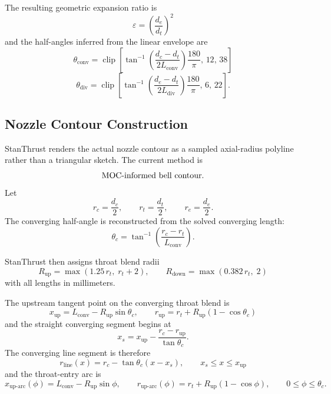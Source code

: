 \documentclass[11pt]{article}
\newcommand{\clip}{\operatorname{clip}}
\begin{document}
The resulting geometric expansion ratio is
\begin{equation}
\varepsilon = \left(\frac{d_e}{d_t}\right)^2
\label{eq:expansion-ratio}
\end{equation}
and the half-angles inferred from the linear envelope are
\begin{equation}
\theta_{\text{conv}}
=
\clip\!\left[
\tan^{-1}\!\left(
\frac{d_c-d_t}{2L_{\text{conv}}}
\right)\frac{180}{\pi},
\,
12,\,
38
\right]
\label{eq:conv-angle}
\end{equation}
\begin{equation}
\theta_{\text{div}}
=
\clip\!\left[
\tan^{-1}\!\left(
\frac{d_e-d_t}{2L_{\text{div}}}
\right)\frac{180}{\pi},
\,
6,\,
22
\right].
\label{eq:div-angle}
\end{equation}

\subsection{Nozzle Contour Construction}
StanThrust renders the actual nozzle contour as a sampled axial-radius polyline rather than a triangular sketch. The current method is
\[
\text{MOC-informed bell contour}.
\]
Let
\[
r_c=\frac{d_c}{2},\qquad r_t=\frac{d_t}{2},\qquad r_e=\frac{d_e}{2}.
\]
The converging half-angle is reconstructed from the solved converging length:
\begin{equation}
\theta_c=\tan^{-1}\!\left(\frac{r_c-r_t}{L_{\text{conv}}}\right).
\label{eq:converging-half-angle}
\end{equation}

StanThrust then assigns throat blend radii
\begin{equation}
R_{\text{up}}=\max(1.25\,r_t,\;r_t+2),
\qquad
R_{\text{down}}=\max(0.382\,r_t,\;2)
\label{eq:throat-blend-radii}
\end{equation}
with all lengths in millimeters.

The upstream tangent point on the converging throat blend is
\begin{equation}
x_{\text{up}}=L_{\text{conv}}-R_{\text{up}}\sin\theta_c,
\qquad
r_{\text{up}}=r_t+R_{\text{up}}\left(1-\cos\theta_c\right)
\label{eq:upstream-tangent}
\end{equation}
and the straight converging segment begins at
\begin{equation}
x_s=x_{\text{up}}-\frac{r_c-r_{\text{up}}}{\tan\theta_c}.
\label{eq:straight-converging-start}
\end{equation}
The converging line segment is therefore
\begin{equation}
r_{\text{line}}(x)=r_c-\tan\theta_c\left(x-x_s\right),
\qquad x_s\le x\le x_{\text{up}}
\label{eq:converging-line}
\end{equation}
and the throat-entry arc is
\begin{equation}
x_{\text{up-arc}}(\phi)=L_{\text{conv}}-R_{\text{up}}\sin\phi,
\qquad
r_{\text{up-arc}}(\phi)=r_t+R_{\text{up}}\left(1-\cos\phi\right),
\qquad 0\le \phi\le \theta_c.
\label{eq:converging-arc}
\end{equation}
\end{document}
